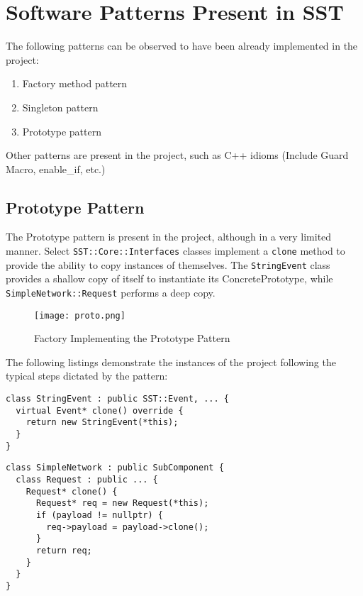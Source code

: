 
\section{Software Patterns Present in SST}
The following patterns can be observed to have been already implemented in the project:
\begin{enumerate}
    \item Factory method pattern
    \item Singleton pattern
    \item Prototype pattern
\end{enumerate}
Other patterns are present in the project, such as C++ idioms (Include Guard Macro, enable\_if, etc.)





\subsection{Prototype Pattern}
The Prototype pattern is present in the project, although in a very limited manner. Select \texttt{SST::Core::Interfaces} classes implement a \texttt{clone} method to provide the ability to copy instances of themselves. The \texttt{StringEvent} class provides a shallow copy of itself to instantiate its ConcretePrototype, while \texttt{SimpleNetwork::Request} performs a deep copy.

\begin{figure}[h]
    \caption{Factory Implementing the Prototype Pattern}
    \centering
    \texttt{[image: proto.png]}
\end{figure}

The following listings demonstrate the instances of the project following the typical steps dictated by the pattern:

\begin{lstlisting}[style=customC++,label=prototype1,caption=StringEvent Implementing the Prototype Pattern \\ File: src/sst/core/interfaces/stringEvent.h]
class StringEvent : public SST::Event, ... {
  virtual Event* clone() override {
    return new StringEvent(*this);
  }
}
\end{lstlisting}

\begin{lstlisting}[style=customC++,label=prototype2,caption=SimpleNetwork::Request Implementing the Prototype Pattern \\ File: src/sst/core/interfaces/simpleNetwork.h]
class SimpleNetwork : public SubComponent {
  class Request : public ... {
    Request* clone() {
      Request* req = new Request(*this);
      if (payload != nullptr) {
        req->payload = payload->clone();
      }
      return req;
    }
  }
}
\end{lstlisting}
